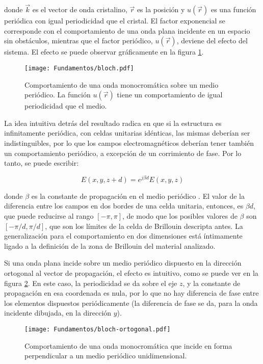 donde $\vec{k}$ es el vector de onda cristalino, $\vec{r}$ es la posición y $u(\vec{r})$ es una función periódica con igual periodicidad que el cristal. El factor exponencial se corresponde con el comportamiento de una onda plana incidente en un espacio sin obstáculos, mientras que el factor periódico, $u(\vec{r})$, deviene del efecto del sistema. El efecto se puede observar gráficamente en la figura \ref{fig:bloch-periodico-1d}.

\begin{figure}[htp]
	\centering
	\texttt{[image: Fundamentos/bloch.pdf]}
	\caption{Comportamiento de una onda monocromática sobre un medio periódico. La función $u(\vec{r})$ tiene un comportamiento de igual periodicidad que el medio.}
	\label{fig:bloch-periodico-1d}
\end{figure}

La idea intuitiva detrás del resultado radica en que si la estructura es infinitamente periódica, con celdas unitarias idénticas, las mismas deberían ser indistinguibles, por lo que los campos electromagnéticos deberían tener también un comportamiento periódico, a excepción de un corrimiento de fase. Por lo tanto, se puede escribir:

\begin{equation}
	E(x,y,z+d) = e^{j \beta d} E(x,y,z)
\end{equation}

donde $\beta$ es la constante de propagación en el medio periódico \cite{TaylorandFrancis}. El valor de la diferencia entre los campos en dos bordes de una celda unitaria, entonces, es $\beta d$, que puede reducirse al rango $[-\pi,\pi]$, de modo que los posibles valores de $\beta$ son $[-\pi/d,\pi/d]$, que son los límites de la celda de Brillouin descripta antes. La generalización para el comportamiento en dos dimensiones está íntimamente ligado a la definición de la zona de Brillouin del material analizado.

Si una onda plana incide sobre un medio periódico dispuesto en la dirección ortogonal al vector de propagación, el efecto es intuitivo, como se puede ver en la figura \ref{fig:bloch-ortogonal}. En este caso, la periodicidad se da sobre el eje $z$, y la constante de propagación en esa coordenada es nula, por lo que no hay diferencia de fase entre los elementos dispuestos periódicamente (la diferencia de fase se da, para la onda incidente dibujada, en la dirección $y$).

\begin{figure}[htp]
	\centering
	\texttt{[image: Fundamentos/bloch-ortogonal.pdf]}
	\caption{Comportamiento de una onda monocromática que incide en forma perpendicular a un medio periódico unidimensional.}
	\label{fig:bloch-ortogonal}
\end{figure}



